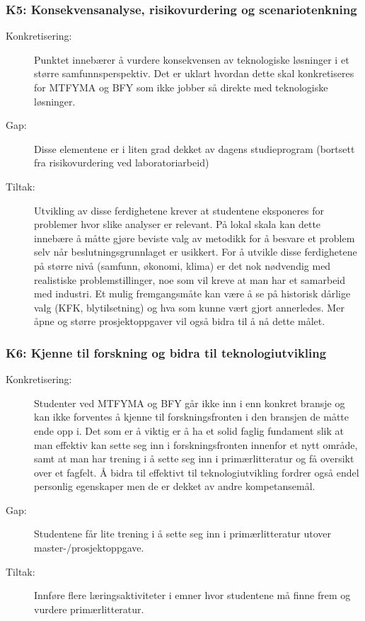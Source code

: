 \subsubsection{K5: Konsekvensanalyse, risikovurdering og scenariotenkning}
\begin{description}
\item[Konkretisering:] Punktet innebærer å vurdere konsekvensen av teknologiske løsninger i et større samfunnsperspektiv. Det er uklart hvordan dette skal konkretiseres for MTFYMA og BFY som ikke jobber så direkte med teknologiske løsninger.
\item[Gap:]Disse elementene er i liten grad dekket av dagens studieprogram (bortsett fra risikovurdering ved laboratoriarbeid)
\item[Tiltak:]Utvikling av disse ferdighetene krever at studentene eksponeres for problemer hvor slike analyser er relevant. På lokal skala kan dette innebære å måtte gjøre beviste valg av metodikk for å besvare et problem selv når beslutningsgrunnlaget er usikkert. For å utvikle disse ferdighetene på større nivå (samfunn, økonomi, klima) er det nok nødvendig med realistiske problemstillinger, noe som vil kreve at man har et samarbeid med industri. Et mulig fremgangsmåte kan være å se på historisk dårlige valg (KFK, blytilsetning) og hva som kunne vært gjort annerledes. Mer åpne og større prosjektoppgaver vil også bidra til å nå dette målet.
\end{description}

\subsubsection{K6: Kjenne til forskning og bidra til teknologiutvikling}
\begin{description}
\item[Konkretisering:] Studenter ved MTFYMA og BFY går ikke inn i enn konkret bransje og kan ikke forventes å kjenne til forskningsfronten i den bransjen de måtte ende opp i. Det som er å viktig er å ha et solid faglig fundament slik at man effektiv kan sette seg inn i forskningsfronten innenfor et nytt område, samt at man har trening i å sette seg inn i primærlitteratur og få oversikt over et fagfelt. Å bidra til effektivt til teknologiutvikling fordrer også endel personlig egenskaper men de er dekket av andre kompetansemål.
\item[Gap:] Studentene får lite trening i å sette seg inn i primærlitteratur utover master-/prosjektoppgave.
\item[Tiltak:] Innføre flere læringsaktiviteter i emner hvor studentene må finne frem og vurdere primærlitteratur. 
\end{description}

